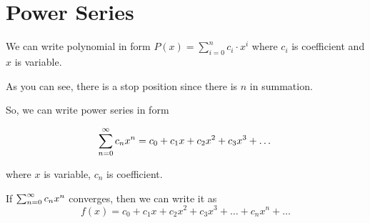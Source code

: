 \chapter{Power Series}

We can write polynomial in form $P(x) = \sum_{i=0}^{n} c_{i}\cdot x^{i}$ where $c_{i}$ is coefficient and $x$ is variable.

As you can see, there is a stop position since there is $n$ in summation.

So, we can write power series in form

\[
  \sum_{n=0}^{\infty} c_{n}x^{n} = c_0 + c_1x + c_2x^2 + c_3x^3 + \dots
\]

where $x$ is variable, $c_{n}$ is coefficient.

\begin{theorem}
  If \(\sum_{n=0}^{\infty} c_{n}x^{n}\) converges, then we can write it as
  \[
    f(x) = c_0 + c_1x+ c_2x^2 + c_3x^3 + \dots + c_nx^n + \dots
  \]
\end{theorem}

